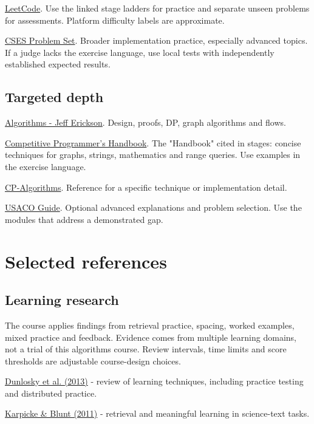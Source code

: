 \documentclass[11pt,letterpaper]{article}
\begin{document}
\href{https://leetcode.com/problemset/}{LeetCode}. Use the linked stage ladders for practice and separate unseen problems for assessments. Platform difficulty labels are approximate.

\href{https://cses.fi/problemset/}{CSES Problem Set}. Broader implementation practice, especially advanced topics. If a judge lacks the exercise language, use local tests with independently established expected results.

\subsection*{Targeted depth}

\href{https://jeffe.cs.illinois.edu/teaching/algorithms/index.html}{Algorithms - Jeff Erickson}. Design, proofs, DP, graph algorithms and flows.

\href{https://cses.fi/book/book.pdf}{Competitive Programmer's Handbook}. The "Handbook" cited in stages: concise techniques for graphs, strings, mathematics and range queries. Use examples in the exercise language.

\href{https://cp-algorithms.com/}{CP-Algorithms}. Reference for a specific technique or implementation detail.

\href{https://usaco.guide/}{USACO Guide}. Optional advanced explanations and problem selection. Use the modules that address a demonstrated gap.

\section{Selected references}\label{sec:27}

\subsection*{Learning research}

The course applies findings from retrieval practice, spacing, worked examples, mixed practice and feedback. Evidence comes from multiple learning domains, not a trial of this algorithms course. Review intervals, time limits and score thresholds are adjustable course-design choices.

\href{https://acs.ist.psu.edu/ist521/dunloskyRMNW13.pdf}{Dunlosky et al. (2013)} - review of learning techniques, including practice testing and distributed practice.

\href{https://pubmed.ncbi.nlm.nih.gov/21252317/}{Karpicke \& Blunt (2011)} - retrieval and meaningful learning in science-text tasks.
\end{document}
